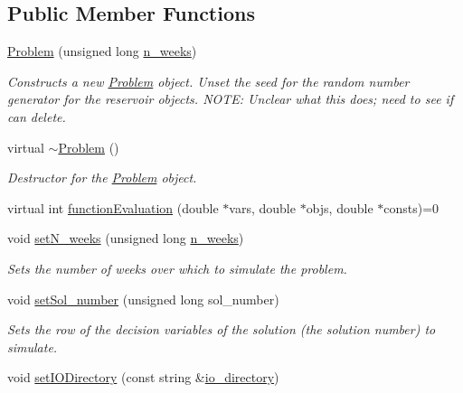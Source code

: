 \subsection*{Public Member Functions}
\begin{DoxyCompactItemize}
\item 
\mbox{\hyperlink{classProblem_a41939e01b382197124fcd9f5e8c7520d}{Problem}} (unsigned long \mbox{\hyperlink{classProblem_ac7513bb0ecdfa4bbb7d2ada3595d71ec}{n\+\_\+weeks}})
\begin{DoxyCompactList}\small\item\em Constructs a new \mbox{\hyperlink{classProblem}{Problem}} object. Unset the seed for the random number generator for the reservoir objects. N\+O\+TE\+: Unclear what this does; need to see if can delete. \end{DoxyCompactList}\item 
virtual \mbox{\hyperlink{classProblem_af175051c1f08660690573aa0021e4106}{$\sim$\+Problem}} ()
\begin{DoxyCompactList}\small\item\em Destructor for the \mbox{\hyperlink{classProblem}{Problem}} object. \end{DoxyCompactList}\item 
virtual int \mbox{\hyperlink{classProblem_acd924a80df4422c5199748c714e9405c}{function\+Evaluation}} (double $\ast$vars, double $\ast$objs, double $\ast$consts)=0
\item 
void \mbox{\hyperlink{classProblem_a1ea4a3d52209fa3f284a4060fb6fa3ab}{set\+N\+\_\+weeks}} (unsigned long \mbox{\hyperlink{classProblem_ac7513bb0ecdfa4bbb7d2ada3595d71ec}{n\+\_\+weeks}})
\begin{DoxyCompactList}\small\item\em Sets the number of weeks over which to simulate the problem. \end{DoxyCompactList}\item 
void \mbox{\hyperlink{classProblem_a855eaf9a98eadfab131d598b51df6d66}{set\+Sol\+\_\+number}} (unsigned long sol\+\_\+number)
\begin{DoxyCompactList}\small\item\em Sets the row of the decision variables of the solution (the solution number) to simulate. \end{DoxyCompactList}\item 
void \mbox{\hyperlink{classProblem_a188254a95b04bf4ed67e66262ea342e9}{set\+I\+O\+Directory}} (const string \&\mbox{\hyperlink{classProblem_ac58848a0d808cf040c3fb3676b4a236f}{io\+\_\+directory}})

\end{DoxyCompactItemize}
